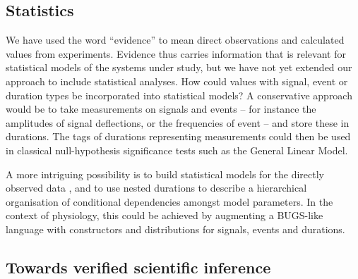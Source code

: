 \documentclass[11pt]{article}
\begin{document}
\subsection*{Statistics}

We have used the word ``evidence'' to mean direct observations and
calculated values from experiments. Evidence thus carries information
that is relevant for statistical models of the systems under study,
but we have not yet extended our approach to include statistical
analyses. How could values with signal, event or duration types be
incorporated into statistical models? A conservative approach would be to
take measurements on signals and events -- for instance the amplitudes
of signal deflections, or the frequencies of event -- and store these in
durations. The tags of durations representing measurements could then
be used in classical null-hypothesis significance
tests such as the General Linear Model. 

A more intriguing possibility is to build statistical models for the
directly observed data \cite{Daniell1991}, and to use nested
durations to describe a hierarchical organisation \cite{Rouder2003}
of conditional dependencies amongst model parameters. In the context
of physiology, this could be achieved by augmenting a BUGS-like
\cite{Gilks1994} language with constructors and distributions for
signals, events and durations.


\subsection*{Towards verified scientific inference}
\end{document}
